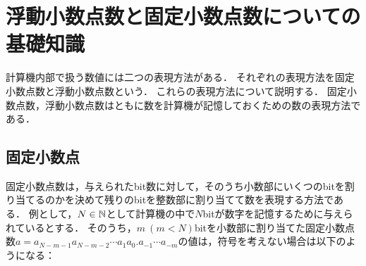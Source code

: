 \chapter{浮動小数点数と固定小数点数についての基礎知識}
\label{chap:基礎知識1}
計算機内部で扱う数値には二つの表現方法がある．
それぞれの表現方法を固定小数点数と浮動小数点数という．
これらの表現方法について説明する．
固定小数点数，浮動小数点数はともに数を計算機が記憶しておくための数の表現方法である．%

\section{固定小数点}
固定小数点数は，与えられたbit数に対して，そのうち小数部にいくつのbitを割り当てるのかを決めて残りのbitを整数部に割り当てて数を表現する方法である．
例として，$N \in \mathbb{N}$として計算機の中で$N$bitが数字を記憶するために与えられているとする．
そのうち，$m \ (m < N)$bitを小数部に割り当てた固定小数点数$a = a_{N-m-1} a_{N-m-2} \cdots a_1 a_0. a_{-1} \cdots a_{-m}$の値は，符号を考えない場合は以下のようになる：

